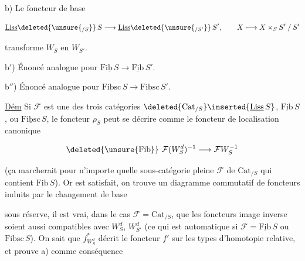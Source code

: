 

b) Le foncteur  de base 

\[
\underline{\mathrm{Liss}}\deleted{\unsure{{}_{/S}}}\,S\longrightarrow
\underline{\mathrm{Liss}}\deleted{\unsure{{}_{/S'}}}\,S',\qquad
X\longmapsto X\times_S S'\mathbin{/}S'
\]

transforme $W_S$ en $W_{S'}$.

b$'$) Énoncé analogue pour $\underline{\mathrm{Fib}\,S}\longrightarrow\underline{\mathrm{Fib}}\,S'$.

b$''$) Énoncé analogue pour $\underline{\mathrm{Fibsc}}\,S\longrightarrow\underline{\mathrm{Fibsc}}\,S'$.

\uline{Dém} Si $\mathcal F$ est une des trois catégories $\deleted{\mathrm{Cat}_{/S}}\inserted{\underline{\mathrm{Liss}}\,S}$, $\underline{\mathrm{Fib}}\,S$, ou $\underline{\mathrm{Fibsc}}\,S$, le foncteur $\rho_S$ peut se décrire comme le foncteur de localisation canonique

\[
\deleted{\unsure{\mathrm{Fib}}}\ \mathcal F(W_S^d)^{-1}\longrightarrow\mathcal F W_S^{-1}
\]

(ça marcherait pour n'importe quelle sous-catégorie pleine $\mathcal F$ de $\mathrm{Cat}_{/S}$ qui contient $\underline{\mathrm{Fib}}\,S$). Or   est satisfait, on trouve un diagramme commutatif de foncteurs induits par le changement de base


 sous réserve, il est vrai, dans le cas $\mathcal F=\mathrm{Cat}_{/S}$, que les foncteurs image inverse soient aussi compatibles avec $W_S^d$, $W_{S'}^d$ (ce qui est automatique si $\mathcal F=\underline{\mathrm{Fib}}\,S$ ou $\underline{\mathrm{Fibsc}}\,S$). On sait que $f^*_{W_S^d}$ décrit le foncteur $f'$ sur les types d'homotopie relative, et  prouve a) comme conséquence

